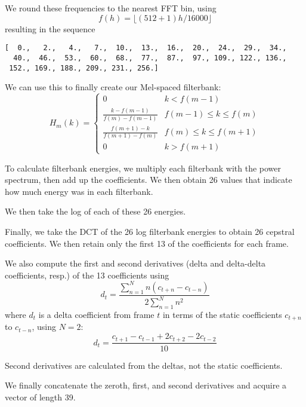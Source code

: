\documentclass{article}
\begin{document}
We round these frequencies to the nearest FFT bin, using
\begin{equation}
f(h) = \lfloor(512+1)h/16000\rfloor
\end{equation}
resulting in the sequence
\begin{verbatim}
[  0.,   2.,   4.,   7.,  10.,  13.,  16.,  20.,  24.,  29.,  34.,
  40.,  46.,  53.,  60.,  68.,  77.,  87.,  97., 109., 122., 136.,
 152., 169., 188., 209., 231., 256.]
\end{verbatim}

We can use this to finally create our Mel-spaced filterbank:
\begin{equation}
H_m(k) = \begin{cases}
0 & k<f(m-1)\\
\frac{k-f(m-1)}{f(m)-f(m-1)} & f(m-1)\leq k \leq f(m) \\
\frac{f(m+1) - k}{f(m+1)-f(m)} & f(m) \leq k \leq f(m+1)\\
0 & k > f(m+1)
\end{cases}
\end{equation}


To calculate filterbank energies, we multiply each filterbank with the power spectrum, then add up the coefficients. We then obtain 26 values that indicate how much energy was in each filterbank.

We then take the log of each of these 26 energies.

Finally, we take the DCT of the 26 log filterbank energies to obtain 26 cepstral coefficients. We then retain only the first 13 of the coefficients for each frame.

We also compute the first and second derivatives (delta and delta-delta coefficients, resp.) of the 13 coefficients using
\begin{equation}
d_t = \frac{\sum^N_{n=1}n\left(c_{t+n}-c_{t-n}\right)}{2\sum_{n=1}^Nn^2}
\end{equation}
where $d_t$ is a delta coefficient from frame $t$ in terms of the static coefficients $c_{t+n}$ to $c_{t-n}$, using $N=2$:
\begin{equation}
d_t = \frac{c_{t+1}-c_{t-1}+2c_{t+2}-2c_{t-2}}{10}
\end{equation}

Second derivatives are calculated from the deltas, not the static coefficients.

We finally concatenate the zeroth, first, and second derivatives and acquire a vector of length 39.
\end{document}
